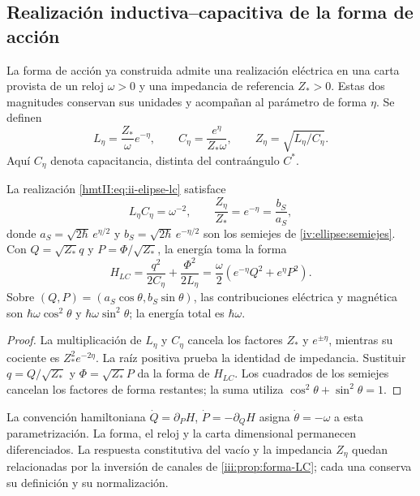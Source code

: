 \subsection{Realización inductiva--capacitiva de la forma de acción}
\label{nuclear:realizacion-lc}

La forma de acción ya construida admite una realización eléctrica en
una carta provista de un reloj \(\omega>0\) y una impedancia de
referencia \(Z_*>0\). Estas dos magnitudes conservan sus unidades y
acompañan al parámetro de forma \(\eta\). Se definen
\begin{equation}
 L_\eta=\frac{Z_*}{\omega}e^{-\eta},\qquad
 C_\eta=\frac{e^\eta}{Z_*\omega},\qquad
 Z_\eta=\sqrt{L_\eta/C_\eta}.
 \label{hmtII:eq:ii-elipse-lc}
\end{equation}
Aquí \(C_\eta\) denota capacitancia, distinta del contraángulo \(C^*\).

\begin{proposition}
\label{nuclear:lc-producto}
La realización \eqref{hmtII:eq:ii-elipse-lc} satisface
\begin{equation}
 L_\eta C_\eta=\omega^{-2},\qquad
 \frac{Z_\eta}{Z_*}=e^{-\eta}=\frac{b_S}{a_S},
 \label{hmtII:eq:ii-elipse-impedancia}
\end{equation}
donde \(a_S=\sqrt{2\hbar}\,e^{\eta/2}\) y
\(b_S=\sqrt{2\hbar}\,e^{-\eta/2}\) son los semiejes de
\cref{iv:ellipse:semiejes}.
Con \(Q=\sqrt{Z_*}q\) y \(P=\Phi/\sqrt{Z_*}\), la energía toma la forma
\[
 H_{LC}=\frac{q^2}{2C_\eta}+\frac{\Phi^2}{2L_\eta}
       =\frac\omega2(e^{-\eta}Q^2+e^\eta P^2).
\]
Sobre \((Q,P)=(a_S\cos\theta,b_S\sin\theta)\), las contribuciones
eléctrica y magnética son \(\hbar\omega\cos^2\theta\) y
\(\hbar\omega\sin^2\theta\); la energía total es \(\hbar\omega\).
\end{proposition}
\begin{proof}
La multiplicación de \(L_\eta\) y \(C_\eta\) cancela los factores
\(Z_*\) y \(e^{\pm\eta}\), mientras su cociente es
\(Z_*^2e^{-2\eta}\). La raíz positiva prueba la identidad de impedancia.
Sustituir \(q=Q/\sqrt{Z_*}\) y \(\Phi=\sqrt{Z_*}P\) da la forma
de \(H_{LC}\). Los cuadrados de los semiejes cancelan los factores
de forma restantes; la suma utiliza \(\cos^2\theta+\sin^2\theta=1\).
\end{proof}

La convención hamiltoniana
\(\dot Q=\partial_PH\), \(\dot P=-\partial_QH\) asigna
\(\dot\theta=-\omega\) a esta parametrización. La forma, el reloj
y la carta dimensional permanecen diferenciados. La respuesta
constitutiva del vacío y la impedancia \(Z_\eta\) quedan relacionadas
por la inversión de canales de \cref{iii:prop:forma-LC}; cada una
conserva su definición y su normalización.
